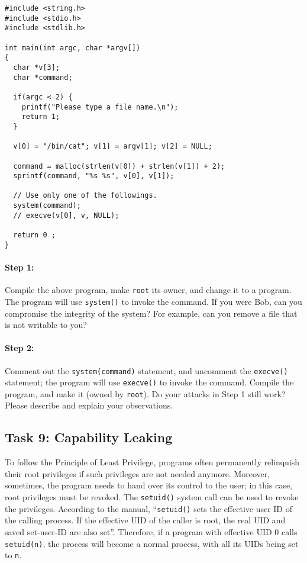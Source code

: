 \begin{Verbatim}[frame=single] 
#include <string.h>
#include <stdio.h>
#include <stdlib.h>

int main(int argc, char *argv[])
{
  char *v[3];
  char *command;

  if(argc < 2) {
    printf("Please type a file name.\n"); 
    return 1;
  }

  v[0] = "/bin/cat"; v[1] = argv[1]; v[2] = NULL;

  command = malloc(strlen(v[0]) + strlen(v[1]) + 2);
  sprintf(command, "%s %s", v[0], v[1]);

  // Use only one of the followings.
  system(command);
  // execve(v[0], v, NULL);

  return 0 ;
}
\end{Verbatim}


\paragraph{Step 1:} Compile the above program, make {\tt root} its owner,
and change it to a \setuid program. The program will use 
{\tt system()} to invoke the command. 
If you were Bob, can you compromise the integrity of the system? For example,
can you remove a file that is not writable to you?


\paragraph{Step 2:} Comment out the {\tt system(command)} statement, and
uncomment the {\tt execve()} statement; the program
will use {\tt execve()} to invoke the command. Compile the program, and
make it \setuid (owned by {\tt root}). 
Do your attacks in Step 1 still work? Please describe and explain your observations.


\subsection{Task 9: Capability Leaking}

To follow the Principle of Least Privilege, \setuid programs often
permanently relinquish their root privileges if such privileges are not
needed anymore. Moreover, sometimes, the program needs to hand over its 
control to the user; in this case, root privileges must be revoked.
The {\tt setuid()} system call can be used to revoke the privileges. 
According to the manual, ``\texttt{setuid()} sets the effective user ID of
the calling process. If the effective UID of the caller is root, the real
UID and saved set-user-ID are also set''. Therefore, if a \setuid program
with effective UID 0 calls \texttt{setuid(n)}, the process will become a
normal process, with all its UIDs being set to \texttt{n}. 

